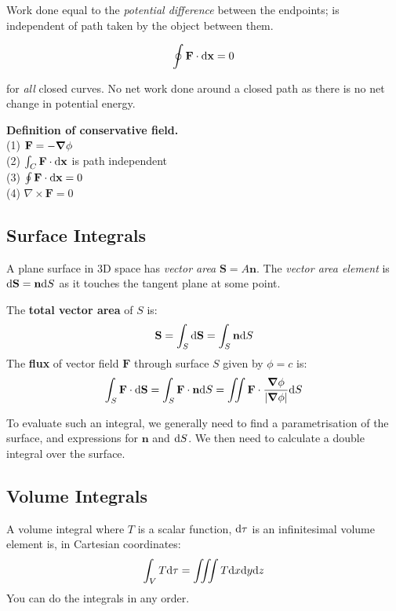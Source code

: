  Work done equal to the \textit{potential difference} between the endpoints; is independent of path taken by the object between them. 
 
 $$\oint \mathbf{F} \cdot \differential \mathbf{x} = 0$$
 
 for \textit{all} closed curves. No net work done around a closed path as there is no net change in potential energy.
 
 \textbf{Definition of conservative field.} \\
 (1) $\mathbf{F} = -\grad \phi$ \\
 (2) $\int_C \mathbf{F} \cdot \differential \mathbf{x}$ is path independent \\
 (3) $\oint \mathbf{F} \cdot \differential \mathbf{x} = 0$ \\
 (4) $\nabla \times \mathbf{F} = 0$

\subsection*{Surface Integrals}

A plane surface in 3D space has \textit{vector area} $\mathbf{S} = A \mathbf{n}$. The \textit{vector area element} is $\differential \mathbf{S} = \mathbf{n} \differential S$ as it touches the tangent plane at some point.

The \textbf{total vector area} of $S$ is:
\begin{equation*}
    \mathbf{S} = \int_{S} \differential \mathbf{S} = \int_{S} \mathbf{n} \differential S
\end{equation*}
The \textbf{flux} of vector field $\mathbf{F}$ through surface $S$ given by $\phi = c$ is:
\begin{equation*}
    \int_{S} \mathbf{F} \cdot \differential \mathbf{S} = \int_{S} \mathbf{F} \cdot \mathbf{n} \differential S = \iint \mathbf{F} \cdot \frac{\grad \phi}{|\grad \phi|} \differential S
\end{equation*}

To evaluate such an integral, we generally need to find a parametrisation of the surface, and expressions for $\mathbf{n}$ and $\differential S$. We
then need to calculate a double integral over the surface.

\subsection*{Volume Integrals}
A volume integral where $T$ is a scalar function, $\differential \tau$ is an infinitesimal volume element is, in Cartesian coordinates:
\begin{equation*}
    \int_{V} T \differential \tau = \iiint T \differential x \differential y \differential z
\end{equation*}
You can do the integrals in any order. 

